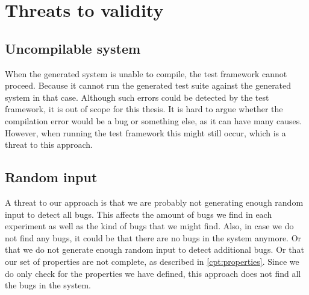 \section{Threats to validity}

\subsection*{Uncompilable system}
When the generated system is unable to compile, the test framework cannot
proceed. Because it cannot run the generated test suite against the generated
system in that case. Although such errors could be detected by the test
framework, it is out of scope for this thesis. It is hard to argue whether the
compilation error would be a bug or something else, as it can have many causes.
However, when running the test framework this might still occur, which is a
threat to this approach.

\subsection*{Random input}
A threat to our approach is that we are probably not generating enough random input to detect all bugs. This affects the amount of bugs we find in each experiment as well as the kind of bugs that we might find. Also, in case we do not find any bugs, it could be that there are no bugs in the system anymore. Or that we do not generate enough random input to detect additional bugs. Or that our set of properties are not complete, as described in \autoref{cpt:properties}. Since we do only check for the properties we have defined, this approach does not find all the bugs in the system.

